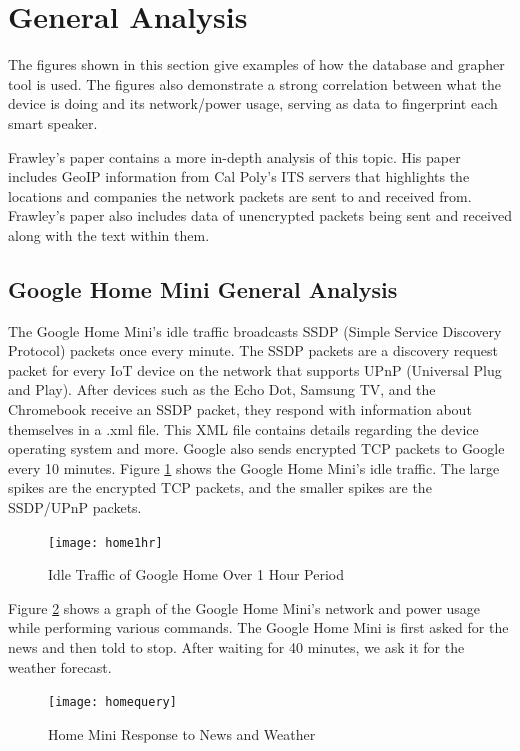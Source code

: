 \section{General Analysis}
\label{General Analysis}
The figures shown in this section give examples of how the database and grapher tool is used. The figures also demonstrate a strong correlation between what the device is doing and its network/power usage, serving as data to fingerprint each smart speaker.

Frawley's paper contains a more in-depth analysis of this topic. His paper includes GeoIP \cite{maxmind} information from Cal Poly's ITS servers \cite{its} that highlights the locations and companies the network packets are sent to and received from. Frawley's paper also includes data of unencrypted packets being sent and received along with the text within them.

\subsection{Google Home Mini General Analysis}
The Google Home Mini's idle traffic broadcasts SSDP (Simple Service Discovery Protocol) packets once every minute. The SSDP packets are a discovery request packet for every IoT device on the network that supports UPnP (Universal Plug and Play). After devices such as the Echo Dot, Samsung TV, and the Chromebook receive an SSDP packet, they respond with information about themselves in a .xml file. This XML file contains details regarding the device operating system and more. Google also sends encrypted TCP packets to Google every 10 minutes. Figure \ref{fig:home} shows the Google Home Mini's idle traffic. The large spikes are the encrypted TCP packets, and the smaller spikes are the SSDP/UPnP packets.

\begin{figure}[H]
  \centering
    \texttt{[image: home1hr]}
  \caption{Idle Traffic of Google Home Over 1 Hour Period}
  \label{fig:home}
\end{figure}

Figure \ref{fig:homequery} shows a graph of the Google Home Mini's network and power usage while performing various commands. The Google Home Mini is first asked for the news and then told to stop. After waiting for 40 minutes, we ask it for the weather forecast.

\begin{figure}[H]
  \centering
    \texttt{[image: homequery]}
  \caption{Home Mini Response to News and Weather}
  \label{fig:homequery}
\end{figure}

